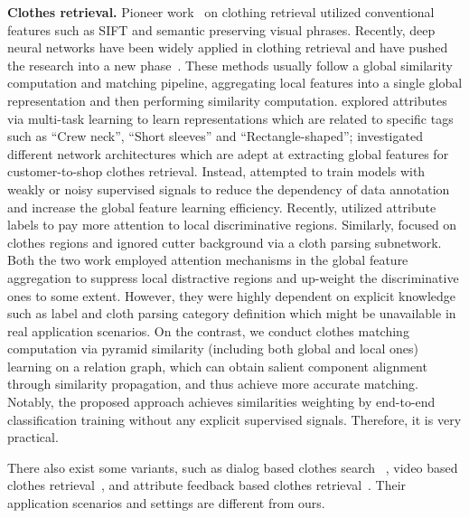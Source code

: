 \documentclass[10pt,twocolumn,letterpaper]{article}
\begin{document}
\textbf{Clothes retrieval.} Pioneer work~\cite{XianwangWang2011,Di2013,Fu2012,Garcia2017} on clothing retrieval utilized conventional features such as SIFT and semantic preserving visual phrases. Recently, deep neural networks have been widely applied in clothing retrieval and have pushed the research into a new phase~\cite{Huang2015,Kiapour2015,Liu2016,Ji2017,Song2017,Corbiere2017,Cheng2017,Zhang2018}. These methods usually follow a global similarity computation and matching pipeline, \ie aggregating local features into a single global representation and then performing similarity computation. \cite{Huang2015,Liu2016} explored attributes via multi-task learning to learn representations which are related to specific tags such as ``Crew neck'', ``Short sleeves'' and ``Rectangle-shaped''; \cite{Kiapour2015,Kuo2017} investigated different network architectures which are adept at extracting global features for customer-to-shop clothes retrieval. Instead, \cite{Zhang2018,Corbiere2017} attempted to train models with weakly or noisy supervised signals to reduce the dependency of data annotation and increase the global feature learning efficiency. Recently, \cite{Ji2017} utilized attribute labels to pay more attention to local discriminative regions. Similarly, \cite{Wang2018b} focused on clothes regions and ignored cutter background via a cloth parsing subnetwork. Both the two work employed attention mechanisms in the global feature aggregation to suppress local distractive regions and up-weight the discriminative ones to some extent.  However, they were highly dependent on explicit knowledge such as label and cloth parsing category definition which might be unavailable in real application scenarios. On the contrast, we conduct clothes matching computation via pyramid similarity (including both global and local ones) learning on a relation graph, which can obtain salient component alignment through similarity propagation, and thus achieve more accurate matching. Notably, the proposed approach achieves similarities weighting by end-to-end classification training without any explicit supervised signals. Therefore, it is very practical.

There also exist some variants, such as  dialog based clothes search~\cite{Guo2018} , video based clothes retrieval~\cite{Cheng2017}, and attribute feedback based clothes retrieval~\cite{Han2017,Zhao2017}. Their application scenarios and settings are different from ours.
\end{document}
